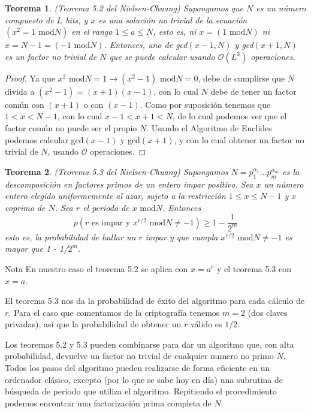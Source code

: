 \documentclass[a4paper,11pt]{book} %
\newtheorem{teorema_contador}{Teorema}
\newcommand{\Teorema}[1]{
		\begin{mybox_gray2}{}
			\begin{teorema_contador}
				 #1 
			\end{teorema_contador} 
		\end{mybox_gray2}
	}
\numberwithin{equation}{chapter}
\begin{document}
	\Teorema{\textit{(Teorema 5.2 del Nielsen-Chuang)} 
	Supongamos que $N$ es un número compuesto de $L$ bits, y $x$ es una solución no trivial de la ecuación $(x^2 = 1 \text{ mod} N)$ en el rango $1 \leq a \leq N$, esto es, ni $x = (1 \text{ mod} N)$ ni $x = N-1 = (-1 \text{ mod} N)$. Entonces, uno de gcd$(x-1,N)$ y gcd$(x+1,N)$ es un factor no trivial de $N$ que se puede calcular usando $\mathcal{O}(L^3)$ operaciones. 
	}
	
	\begin{proof}
	Ya que $x^2 \text{ mod} N = 1 \rightarrow (x^2 -1) \text{ mod} N = 0$, debe de cumplirse que $N$ divida a $(x^2-1) = (x+1)(x-1)$, con lo cual $N$ debe de tener un factor común con $(x+1)$ o con $(x-1)$. Como por suposición tenemos que $1 <  x < N-1$, con lo cual $x-1 < x+1 < N$, de lo cual podemos ver que el factor común no puede ser el propio $N$. Usando el Algoritmo de Euclides \cite{bib_Euclides} podemos calcular gcd$(x-1)$ y gcd$(x+1)$, y con lo cual obtener un factor no trivial de $N$, usando $\mathcal{O}$ operaciones.
	\end{proof}

	\Teorema{\textit{(Teorema 5.3 del Nielsen-Chuang)} 
	Supongamos $N = p^{\alpha_1}_1 \dots p^{\alpha_m}_m $ es la descomposición en factores primos de un entero impar positivo. Sea $x$ un número entero elegido uniformemente al azar, sujeto a la restricción $1 \leq x \leq N-1$ y $x$ coprimo de $N$. Sea $r$ el periodo de $x \text{ mod} N$. Entonces
	\begin{equation}
	p(r \text{ es impar y } x^{r/2} \text{ mod} N \neq - 1) \geq 1 - \frac{1}{2^m}
	\end{equation}
esto es, la probabilidad de hallar un $r$ impar y que cumpla $x^{r/2} \text{ mod} N \neq - 1$ es mayor que 1 - 1/$2^m$.
	}


\begin{mybox_blue}{Nota}
En nuestro caso el teorema 5.2 se aplica con $x = a^r$ y el teorema 5.3 con $x = a$. 
\vspace{0.3cm}

El teorema 5.3 nos da la probabilidad de éxito del algoritmo para cada cálculo de $r$. Para el caso que comentamos de la criptografía tenemos $m=2$ (dos claves privadas), así que 
la probabilidad de obtener un $r$ válido es $1/2$.
\end{mybox_blue}
    
Los teoremas 5.2 y 5.3 pueden combinarse para dar un algoritmo que, con alta probabilidad, devuelve un factor no trivial de cualquier numero no primo $N$. Todos los pasos del algoritmo pueden realizarse de forma eficiente en un ordenador clásico, excepto (por lo que se sabe hoy en día) una subrutina de búsqueda de periodo que utiliza el algoritmo. Repitiendo el procedimiento podemos encontrar una factorización prima completa de $N$.
\end{document}

